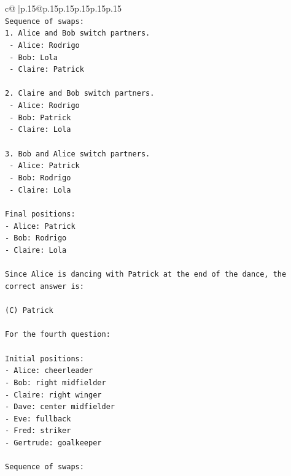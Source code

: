 \documentclass{article}
\begin{document}
{\begin{supertabular}{c@{$\;$}|p{.15\linewidth}@{}p{.15\linewidth}p{.15\linewidth}p{.15\linewidth}p{.15\linewidth}p{.15\linewidth}}
{{{\\ 
\texttt{Sequence of swaps:} \\
\texttt{1. Alice and Bob switch partners.} \\
\texttt{   {-} Alice: Rodrigo} \\
\texttt{   {-} Bob: Lola} \\
\texttt{   {-} Claire: Patrick} \\
\\ 
\texttt{2. Claire and Bob switch partners.} \\
\texttt{   {-} Alice: Rodrigo} \\
\texttt{   {-} Bob: Patrick} \\
\texttt{   {-} Claire: Lola} \\
\\ 
\texttt{3. Bob and Alice switch partners.} \\
\texttt{   {-} Alice: Patrick} \\
\texttt{   {-} Bob: Rodrigo} \\
\texttt{   {-} Claire: Lola} \\
\\ 
\texttt{Final positions:} \\
\texttt{{-} Alice: Patrick} \\
\texttt{{-} Bob: Rodrigo} \\
\texttt{{-} Claire: Lola} \\
\\ 
\texttt{Since Alice is dancing with Patrick at the end of the dance, the correct answer is:} \\
\\ 
\texttt{(C) Patrick} \\
\\ 
\texttt{For the fourth question:} \\
\\ 
\texttt{Initial positions:} \\
\texttt{{-} Alice: cheerleader} \\
\texttt{{-} Bob: right midfielder} \\
\texttt{{-} Claire: right winger} \\
\texttt{{-} Dave: center midfielder} \\
\texttt{{-} Eve: fullback} \\
\texttt{{-} Fred: striker} \\
\texttt{{-} Gertrude: goalkeeper} \\
\\ 
\texttt{Sequence of swaps:} \\
}}}
\end{supertabular}}
\end{document}
